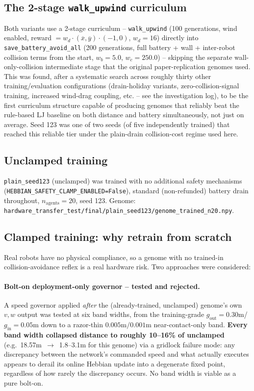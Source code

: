 \documentclass[11pt]{article}
\begin{document}
\subsection{The 2-stage \texttt{walk\_upwind} curriculum}
\label{sec:curriculum}
Both variants use a 2-stage curriculum -- \texttt{walk\_upwind} (100 generations, wind
enabled, reward $=w_d\cdot(\overline{x},\overline{y})\cdot(-1,0)$, $w_d=16$) directly into
\texttt{save\_battery\_avoid\_all} (200 generations, full battery + wall + inter-robot
collision terms from the start, $w_b=5.0$, $w_c=250.0$) -- skipping the separate
wall-only-collision intermediate stage that the original paper-replication genomes used. This
was found, after a systematic search across roughly thirty other training/evaluation
configurations (drain-holiday variants, zero-collision-signal training, increased wind-drag
coupling, etc. -- see the investigation log), to be the first curriculum structure capable of
producing genomes that reliably beat the rule-based LJ baseline on both distance and battery
simultaneously, not just on average. Seed 123 was one of two seeds (of five independently
trained) that reached this reliable tier under the plain-drain collision-cost regime used
here.

\subsection{Unclamped training}
\texttt{plain\_seed123} (unclamped) was trained with no additional safety mechanisms
(\texttt{HEBBIAN\_SAFETY\_CLAMP\_ENABLED=False}), standard (non-refunded) battery drain
throughout, $n_{\text{agents}}=20$, seed 123. Genome:
\texttt{hardware\_transfer\_test/final/plain\_seed123/genome\_trained\_n20.npy}.

\subsection{Clamped training: why retrain from scratch}
\label{sec:clamp}
Real robots have no physical compliance, so a genome with no trained-in collision-avoidance
reflex is a real hardware risk. Two approaches were considered:

\paragraph{Bolt-on deployment-only governor -- tested and rejected.} A speed governor applied
\emph{after} the (already-trained, unclamped) genome's own $v,w$ output was tested at six
band widths, from the training-grade $g_{\text{out}}{=}0.30\text{m}$/$g_{\text{in}}{=}0.05\text{m}$
down to a razor-thin $0.005\text{m}/0.001\text{m}$ near-contact-only band. \textbf{Every band
width collapsed distance to roughly 10--16\% of unclamped} (e.g.\ 18.57m~$\to$~1.8--3.1m for
this genome) via a gridlock failure mode: any discrepancy between the network's commanded
speed and what actually executes appears to derail its online Hebbian update into a
degenerate fixed point, regardless of how rarely the discrepancy occurs. No band width is
viable as a pure bolt-on.
\end{document}
